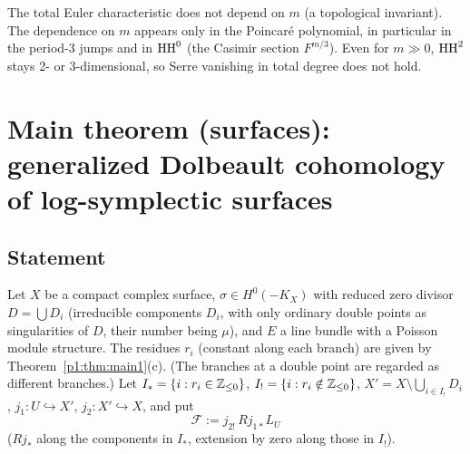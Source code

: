 \begin{obs}\tP
The total Euler characteristic does not depend on $m$ (a topological invariant). The dependence on $m$ appears only in the Poincar\'e polynomial, in particular in the period-3 jumps and in $\mathrm{HH}^0$ (the Casimir section $F^{m/3}$). Even for $m\gg0$, $\mathrm{HH}^2$ stays 2- or 3-dimensional, so Serre vanishing in total degree does not hold.
\end{obs}

\section{Main theorem (surfaces): generalized Dolbeault cohomology of log-symplectic surfaces}\label{p1:sec:main2}
\subsection{Statement}
Let $X$ be a compact complex surface, $\sigma\in H^0(-K_X)$ with reduced zero divisor $D=\bigcup D_i$ (irreducible components $D_i$, with only ordinary double points as singularities of $D$, their number being $\mu$), and $E$ a line bundle with a Poisson module structure. The residues $r_i$ (constant along each branch) are given by Theorem~\ref{p1:thm:main1}(c). (The branches at a double point are regarded as different branches.)
Let $I_*=\{i:r_i\in\mathbb Z_{\le0}\}$, $I_!=\{i:r_i\notin\mathbb Z_{\le0}\}$, $X'=X\setminus\bigcup_{i\in I_!}D_i$, $j_1:U\hookrightarrow X'$, $j_2:X'\hookrightarrow X$, and put
\[\mathcal F:=j_{2!}\,Rj_{1*}L_U\]
($Rj_*$ along the components in $I_*$, extension by zero along those in $I_!$).

